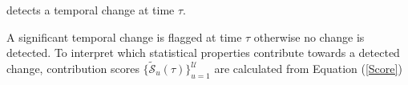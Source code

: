 \begin{algorithm}
\begin{algorithmic}[1]
{\[%
\] }
       
       detects a temporal change  at time $\tau$. %
       \BREAK 

     \OUTPUT A significant temporal change  is flagged  at time $\tau$ otherwise no change is detected. To interpret which statistical properties  contribute towards a detected change, contribution scores $\{ \tilde{\mathcal{S}}_u (\tau)\}_{u=1}^\mathcal{U}$  are calculated from Equation (\ref{Score})
  \end{algorithmic}  
  \label{Tab:GTD}
\end{algorithm}
  
